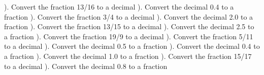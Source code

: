 \documentclass{article}%
\begin{document}
\newline%
). Convert the fraction 13/16 to a decimal%
\newline%
\newline%
). Convert the decimal 0.4 to a fraction%
\newline%
\newline%
). Convert the fraction 3/4 to a decimal%
\newline%
\newline%
). Convert the decimal 2.0 to a fraction%
\newline%
\newline%
). Convert the fraction 13/15 to a decimal%
\newline%
\newline%
). Convert the decimal 2.5 to a fraction%
\newline%
\newline%
). Convert the fraction 19/9 to a decimal%
\newline%
\newline%
). Convert the fraction 5/11 to a decimal%
\newline%
\newline%
). Convert the decimal 0.5 to a fraction%
\newline%
\newline%
). Convert the decimal 0.4 to a fraction%
\newline%
\newline%
). Convert the decimal 1.0 to a fraction%
\newline%
\newline%
). Convert the fraction 15/17 to a decimal%
\newline%
\newline%
). Convert the decimal 0.8 to a fraction%
\newline%
\newline%
\newline%
\end{document}
